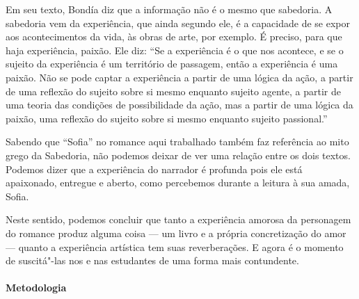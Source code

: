 \documentclass[12pt]{extarticle}
\begin{document}
Em seu texto, Bondía diz que a informação não é o mesmo que sabedoria.
A sabedoria vem da experiência, que ainda segundo ele, é a capacidade
de se expor  aos acontecimentos da vida, às obras de arte, por exemplo.
É preciso, para que haja experiência, paixão.  Ele diz: ``Se a experiência é 
o que nos acontece, e se o sujeito da experiência é um território de passagem,
então a experiência é uma paixão. Não se pode captar
a experiência a partir de uma lógica da ação, a partir
de uma reflexão do sujeito sobre si mesmo enquanto
sujeito agente, a partir de uma teoria das condições de
possibilidade da ação, mas a partir de uma lógica da
paixão, uma reflexão do sujeito sobre si mesmo enquanto sujeito passional.''

Sabendo que ``Sofia'' no romance aqui trabalhado também faz referência 
ao mito grego da Sabedoria, não podemos deixar de ver uma relação
entre os dois textos. Podemos dizer que a experiência do narrador
é profunda pois ele está apaixonado, entregue e aberto, como percebemos
durante a leitura à sua amada, Sofia. 

Neste sentido, podemos concluir que tanto a experiência amorosa da personagem
do romance produz alguma coisa --- um livro e a própria concretização do amor ---
quanto a experiência artística tem suas reverberações. E agora é o momento de 
suscitá"-las nos e nas estudantes de uma forma mais contundente.

\paragraph{Metodologia}
\end{document}
